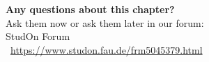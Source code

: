 \begin{frame}[c]
	\begin{center}
		{\bf Any questions about this chapter?}\\[0.5cm]
		Ask them now or ask them later in our forum: \\\bigskip
		StudOn Forum \\
		\faLink\ \url{https://www.studon.fau.de/frm5045379.html} \smallskip

	\end{center}
\end{frame}
